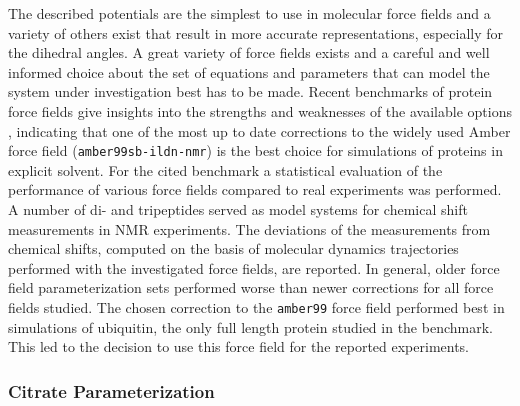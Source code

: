 \documentclass[english, a4paper, 12pt, titlepage, draft]{article}
\begin{document}
The described potentials are the simplest to use in molecular force fields and a variety of others exist that result in more accurate representations, especially for the dihedral angles.
A great variety of force fields exists and a careful and well informed choice about the set of equations and parameters that can model the system under investigation best has to be made.
Recent benchmarks of protein force fields give insights into the strengths and weaknesses of the available options \cite{proteinFF}, indicating that one of the most up to date corrections to the widely used Amber force field (\texttt{amber99sb-ildn-nmr}) \cite{amber99sb-ildn-nmr} is the best choice for simulations of proteins in explicit solvent.
For the cited benchmark a statistical evaluation of the performance of various force fields compared to real experiments was performed.
A number of di- and tripeptides served as model systems for chemical shift measurements in NMR experiments.
The deviations of the measurements from chemical shifts, computed on the basis of molecular dynamics trajectories performed with the investigated force fields, are reported.
In general, older force field parameterization sets performed worse than newer corrections for all force fields studied.
The chosen correction to the \texttt{amber99} force field performed best in simulations of ubiquitin, the only full length protein studied in the benchmark.
This led to the decision to use this force field for the reported experiments.


\subsubsection{Citrate Parameterization}
\end{document}
